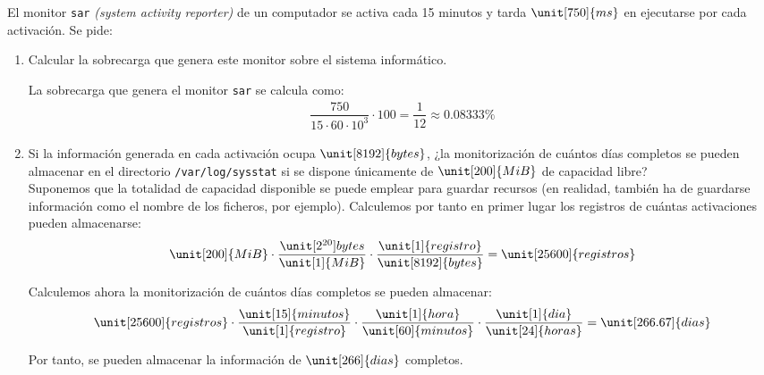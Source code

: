 \begin{ejercicio}
    El monitor \verb|sar| \emph{(system activity reporter)} de un computador se activa cada 15 minutos y tarda $\unit[750]{ms}$ en ejecutarse por cada activación. Se pide:
    \begin{enumerate}
        \item Calcular la sobrecarga que genera este monitor sobre el sistema informático.
        
        La sobrecarga que genera el monitor \verb|sar| se calcula como:
        \begin{align*}
            \dfrac{750}{15\cdot 60\cdot 10^3} \cdot 100 = \dfrac{1}{12}\approx 0.08333\%
        \end{align*}
        \item Si la información generada en cada activación ocupa $\unit[8192]{bytes}$, ¿la monitorización de cuántos días completos se pueden almacenar en el directorio \verb|/var/log/sysstat| si se dispone únicamente de $\unit[200]{MiB}$ de capacidad libre?\\

        Suponemos que la totalidad de capacidad disponible se puede emplear para guardar recursos (en realidad, también ha de guardarse información como el nombre de los ficheros, por ejemplo). Calculemos por tanto en primer lugar los registros de cuántas activaciones pueden almacenarse:
        \begin{equation*}
            \unit[200]{MiB}\cdot \dfrac{\unit[2^{20}]{bytes}}{\unit[1]{MiB}} \cdot \dfrac{\unit[1]{registro}}{\unit[8192]{bytes}} = \unit[25600]{registros}
        \end{equation*}

        Calculemos ahora la monitorización de cuántos días completos se pueden almacenar:
        \begin{align*}
            \unit[25600]{registros} \cdot \dfrac{\unit[15]{minutos}}{\unit[1]{registro}} \cdot \dfrac{\unit[1]{hora}}{\unit[60]{minutos}} \cdot \dfrac{\unit[1]{dia}}{\unit[24]{horas}} = \unit[266.67]{dias}
        \end{align*}

        Por tanto, se pueden almacenar la información de $\unit[266]{dias}$ completos.
    \end{enumerate}
\end{ejercicio}
\begin{comment}
    Solución: La sobrecarga es del 0,083 \% y se pueden almacenar la información de 266 días completos.
\end{comment}

